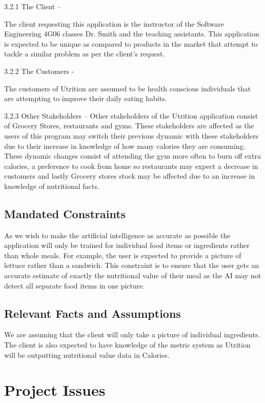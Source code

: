 \documentclass[12pt]{article}
\begin{document}
3.2.1 The Client –  

The client requesting this application is the instructor of the Software Engineering 4G06 classes Dr. Smith and the teaching assistants. This application is expected to be unique as compared to products in the market that attempt to tackle a similar problem as per the client's request.  

3.2.2 The Customers -  

The customers of Utrition are assumed to be health conscious individuals that are attempting to improve their daily eating habits. 

3.2.3 Other Stakeholders – Other stakeholders of the Utrition application consist of Grocery Stores, restaurants and gyms. These stakeholders are affected as the users of this program may switch their previous dynamic with these stakeholders due to their increase in knowledge of how many calories they are consuming. These dynamic changes consist of attending the gym more often to burn off extra calories, a preference to cook from home so restaurants may expect a decrease in customers and lastly Grocery stores stock may be affected due to an increase in knowledge of nutritional facts. 

\subsection{Mandated Constraints} 

As we wish to make the artificial intelligence as accurate as possible the application will only be trained for individual food items or ingredients rather than whole meals. For example, the user is expected to provide a picture of lettuce rather than a sandwich. This constraint is to ensure that the user gets an accurate estimate of exactly the nutritional value of their meal as the AI may not detect all separate food items in one picture. 

\subsection{Relevant Facts and Assumptions } 


We are assuming that the client will only take a picture of individual ingredients. The client is also expected to have knowledge of the metric system as Utrition will be outputting nutritional value data in Calories.

\section{Project Issues}
\end{document}
